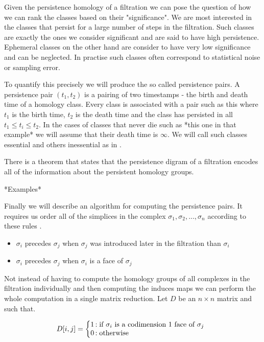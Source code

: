 Given the persistence homology of a filtration we can pose the question of how we can rank the classes based on their "significance". We are most interested in the classes that persist for a large number of steps in the filtration. Such classes are exactly the ones we consider significant and are said to have high persistence. Ephemeral classes on the other hand are consider to have very low significance and can be neglected. In practise such classes often correspond to statistical noise or sampling error.



To quantify this precisely we will produce the so called persistence pairs. A persistence pair $(t_1, t_2)$ is a pairing of two timestamps - the birth and death time of a homology class. Every class is associated with a pair such as this where $t_1$ is the birth time, $t_2$ is the death time and the class has persisted in all $t_1 \le t_i \le t_2$. In the cases of classes that never die such as *this one in that example* we will assume that their death time is $\infty$. We will call such classes essential and others inessential as in \cite{comp-topo}.

There is a theorem that states that the persistence digram of a filtration encodes all of the information about the persistent homology groups.

*Examples*

Finally we will describe an algorithm for computing the persistence pairs. It requires us order all of the simplices in the complex $\sigma_1, \sigma_2, ..., \sigma_n$ according to these rules \cite{ph-a-survey}.

\begin{itemize}
    \item $\sigma_i$ precedes $\sigma_j$ when $\sigma_j$ was introduced later in the filtration than $\sigma_i$
    \item $\sigma_i$ precedes $\sigma_j$ when $\sigma_i$ is a face of $\sigma_j$
\end{itemize}

Not instead of having to compute the homology groups of all complexes in the filtration individually and then computing the induces maps we can perform the whole computation in a single matrix reduction. Let $D$ be an $n\times n$ matrix and such that.

   $$
   D[i, j] = \left\{
       \begin{array}{@{}l@{\thinspace}l}
           \text{1}  &: \text{if } \sigma_i \text{ is a codimension 1 face of } \sigma_j \\
           \text{0}  &: \text{otherwise} \\
       \end{array}
   \right.
   $$

